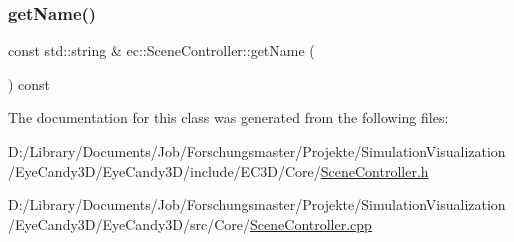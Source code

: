 \subsubsection{\texorpdfstring{get\+Name()}{getName()}}
{\footnotesize\ttfamily const std\+::string \& ec\+::\+Scene\+Controller\+::get\+Name (\begin{DoxyParamCaption}{ }\end{DoxyParamCaption}) const}



The documentation for this class was generated from the following files\+:\begin{DoxyCompactItemize}
\item 
D\+:/\+Library/\+Documents/\+Job/\+Forschungsmaster/\+Projekte/\+Simulation\+Visualization/\+Eye\+Candy3\+D/\+Eye\+Candy3\+D/include/\+E\+C3\+D/\+Core/\mbox{\hyperlink{_scene_controller_8h}{Scene\+Controller.\+h}}\item 
D\+:/\+Library/\+Documents/\+Job/\+Forschungsmaster/\+Projekte/\+Simulation\+Visualization/\+Eye\+Candy3\+D/\+Eye\+Candy3\+D/src/\+Core/\mbox{\hyperlink{_scene_controller_8cpp}{Scene\+Controller.\+cpp}}\end{DoxyCompactItemize}
